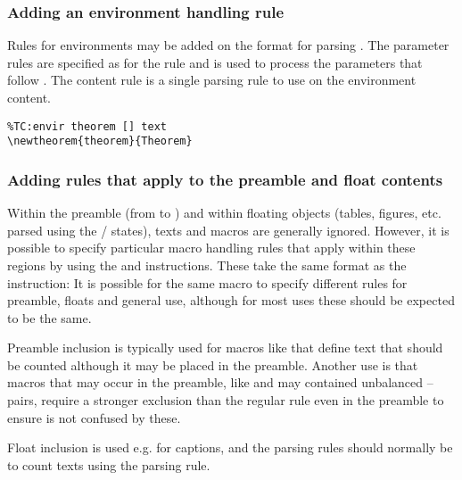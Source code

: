 \documentclass{article}
\begin{document}
\subsubsection{Adding an environment handling rule}

Rules for environments may be added on the format
for parsing . The parameter rules are specified as for the  rule and is used to process the parameters that follow . The content rule is a single parsing rule to use on the environment content.

\begin{lstlisting}
%TC:envir theorem [] text
\newtheorem{theorem}{Theorem}
\end{lstlisting}

\subsubsection{Adding rules that apply to the preamble and float contents}

Within the preamble (from  to ) and within floating objects (tables, figures, etc. parsed using the / states), texts and macros are generally ignored. However, it is possible to specify particular macro handling rules that apply within these regions by using the  and  \TeXcount{} instructions. These take the same format as the  instruction:
It is possible for the same macro to specify different rules for preamble, floats and general use, although for most uses these should be expected to be the same.

Preamble inclusion is typically used for macros like  that define text that should be counted although it may be placed in the preamble. Another use is that macros that may occur in the preamble, like  and may contained unbalanced -- pairs, require a stronger exclusion than the regular  rule even in the preamble to ensure \TeXcount{} is not confused by these.

Float inclusion is used e.g. for captions, and the parsing rules should normally be to count texts using the  parsing rule.
\end{document}
